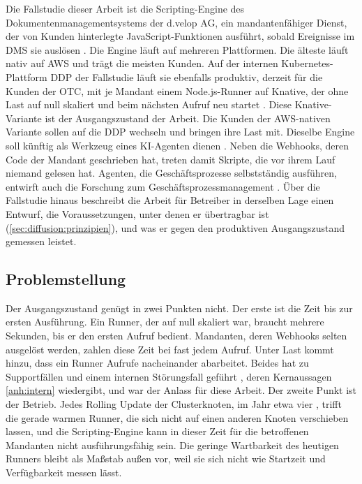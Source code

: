 Die Fallstudie dieser Arbeit ist die Scripting-Engine des Dokumentenmanagementsystems der d.velop AG, ein
mandantenfähiger Dienst, der von Kunden hinterlegte JavaScript-Funktionen ausführt, sobald Ereignisse im \ac{DMS} sie
auslösen \autocite{dvelop_ag_dvelop_2026}. Die Engine läuft auf mehreren Plattformen. Die älteste läuft nativ auf
\ac{AWS} und trägt die meisten Kunden. Auf der internen Kubernetes-Plattform \ac{DDP} der Fallstudie läuft sie ebenfalls
produktiv, derzeit für die Kunden der \ac{OTC}, mit je Mandant einem Node.js-Runner auf
Knative, der ohne Last auf null skaliert und beim nächsten Aufruf neu startet
\autocite{the_knative_authors_configuring_2026}. Diese Knative-Variante ist der Ausgangszustand der
Arbeit. Die Kunden der \acs{AWS}-nativen Variante sollen auf die DDP wechseln und bringen ihre Last mit. Dieselbe Engine soll
künftig als Werkzeug eines \acs{KI}-Agenten dienen \autocite{intern_code_mode_2026}. Neben die Webhooks, deren Code der Mandant geschrieben hat, treten damit
Skripte, die vor ihrem Lauf niemand gelesen hat. Agenten, die Geschäftsprozesse selbstständig ausführen, entwirft auch
die Forschung zum Geschäftsprozessmanagement \autocite[S.~1]{skolik_modular_2026}. Über die Fallstudie hinaus beschreibt die Arbeit für Betreiber in
derselben Lage einen Entwurf, die Voraussetzungen, unter denen er übertragbar ist (\autoref{sec:diffusion:prinzipien}),
und was er gegen den produktiven Ausgangszustand gemessen leistet.

\subsection{Problemstellung}
\label{sec:einleitung:problemstellung}

Der Ausgangszustand genügt in zwei Punkten nicht. Der erste ist die Zeit bis zur ersten
Ausführung. Ein Runner, der auf null skaliert war, braucht mehrere Sekunden, bis er den ersten
Aufruf bedient. Mandanten, deren Webhooks selten ausgelöst werden, zahlen diese Zeit bei fast
jedem Aufruf. Unter Last kommt hinzu, dass ein Runner Aufrufe nacheinander abarbeitet. Beides
hat zu Supportfällen und einem internen Störungsfall geführt
\autocites{intern_supportfaelle_otc_2026}{intern_stoerungsfall_2026}, deren Kernaussagen \ref{anh:intern} wiedergibt, und war der Anlass für diese Arbeit. Der zweite Punkt ist
der Betrieb. Jedes Rolling Update der Clusterknoten, im Jahr etwa vier \autocite{intern_ddp_updates_2026}, trifft die gerade
warmen Runner, die sich nicht auf einen anderen Knoten verschieben lassen, und die Scripting-Engine kann in dieser Zeit für
die betroffenen Mandanten nicht ausführungsfähig sein. Die geringe Wartbarkeit des heutigen Runners bleibt als Maßstab außen vor, weil sie sich nicht wie Startzeit und
Verfügbarkeit messen lässt.

